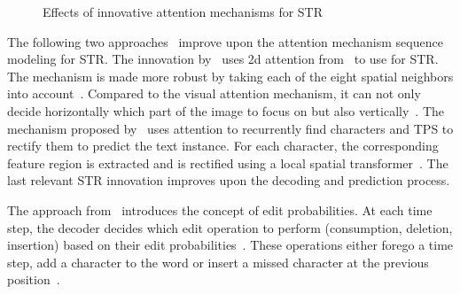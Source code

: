 \begin{figure}[ht]
    \centering\scriptsize
    \caption{%
        Effects of innovative attention mechanisms for STR\label{fig:attention-examples}
    }
\end{figure}
The following two approaches~\citep{li_show_2019,liu_char-net_2018} improve upon the attention
mechanism sequence modeling for \ac{STR}.
The innovation by~\cite{li_show_2019} uses 2d attention from~\citep{xu_show_2016} to use
for \ac{STR}.
The mechanism is made more robust by taking each of the eight spatial neighbors into
account~\citep{li_show_2019}.
Compared to the visual attention mechanism, it can not only decide horizontally which part of the
image to focus on but also vertically~\citep{li_show_2019,ghosh_visual_2017}.
The mechanism proposed by~\cite{liu_char-net_2018} uses attention to recurrently find characters and
\ac{TPS} to rectify them to predict the text instance.
For each character, the corresponding feature region is extracted and is
rectified using a local spatial transformer~\citep{liu_char-net_2018}.
The last relevant \ac{STR} innovation improves upon the decoding and prediction process.

The approach from~\cite{bai_edit_2018} introduces the concept of edit probabilities.
At each time step, the decoder decides which edit operation to perform (consumption, deletion,
insertion) based on their edit probabilities~\citep{bai_edit_2018}.
These operations either forego a time step, add a character to the word or insert a missed character
at the previous position~\citep{bai_edit_2018}.


